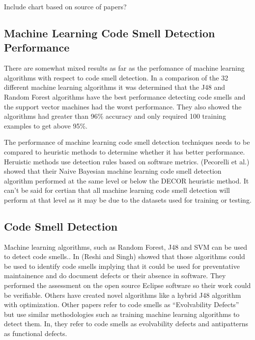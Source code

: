 \documentclass[conference]{IEEEtran}
\begin{document}
Include chart based on source of papers?

\subsection{Machine Learning Code Smell Detection Performance}
There are somewhat mixed results as far as the perfomance of machine learning algorithms with respect to code smell detection\cite{nucci_detecting_2018}.
In a comparison of the 32 different machine learning algorithms\cite{arcelli_fontana_comparing_2016} it was determined that the J48 and Random Forest algorithms have the best performance detecting code smells and the support vector machines had the worst performance. They also showed the algorithms had greater than 96\% accuracy and only required 100 training examples to get above 95\%.

The performance of machine learning code smell detection techniques needs to be compared to heuristic methods to determine whether it has better performance. Heruistic methods use detection rules based on software metrics. (Pecorelli et al.) showed\cite{pecorelli_comparing_2019} that their Naive Bayesian machine learning code smell detection algorithm performed at the same level or below the DECOR heuristic method. 
It can't be said for certian that all machine learning code smell detection will perform at that level as it may be due to the datasets used for training or testing.

\subsection{Code Smell Detection}
Machine learning algorithms, such as Random Forest, J48 and SVM can be used to detect code smells.\cite{reshi_investigating_2019}\cite{karaduzovic-hadziabdic_comparison_2018}\cite{reshi_predicting_2018}\cite{nucci_detecting_2018}\cite{karaduzovic-hadziabdic_comparison_2018}. In\cite{reshi_investigating_2019}\cite{reshi_predicting_2018} (Reshi and Singh) showed that those algorithms could be used to identify code smells implying that it could be used for preventative maintainence and do document defects or their absence in software. They performed the assessment on the open source Eclipse software so their work could be verifiable. Others have created novel algorithms\cite{kaur_sp-j48:_2019} like a hybrid J48 algorithm with optimization.
Other papers refer to code smells as ``Evolvability Defects''\cite{tsuda_machine_2018} but use similar methodologies such as training machine learning algorithms to detect them. In\cite{tsuda_machine_2018}, they refer to code smells as evolvability defects and antipatterns as functional defects.
\end{document}
